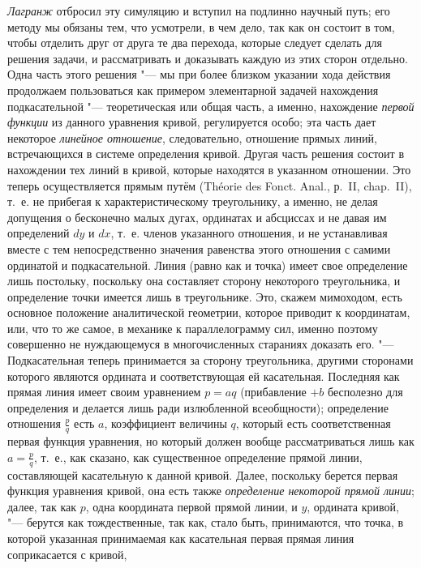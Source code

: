 {\em Лагранж} отбросил эту симуляцию и вступил на
подлинно научный путь; его методу мы обязаны тем, что усмотрели, в чем
дело, так как он состоит в том, чтобы отделить друг от друга те два
перехода, которые следует сделать для решения задачи, и рассматривать и
доказывать каждую из этих сторон отдельно. Одна часть этого решения "--- мы
при более близком указании хода действия продолжаем пользоваться как
примером элементарной задачей нахождения подкасательной "--- теоретическая или
общая часть, а именно, нахождение {\em первой функции}
из данного уравнения кривой, регулируется особо; эта часть дает некоторое
{\em линейное отношение}, следовательно, отношение
прямых линий, встречающихся в системе определения кривой. Другая часть
решения состоит в нахождении тех линий в кривой, которые находятся в
указанном отношении. Это теперь осуществляется прямым путём
(Théorie des Fonct. Anal., р.~II, chap.~II), т.~е. не
прибегая к характеристическому треугольнику, а именно, не делая допущения о
бесконечно малых дугах, ординатах и абсциссах и не давая им определений
$dy$ и $dx$, т.~е. членов
указанного отношения, и не устанавливая вместе с тем непосредственно
значения равенства этого отношения с самими ординатой и подкасательной.
Линия (равно как и точка) имеет свое определение лишь постольку, поскольку
она составляет сторону некоторого треугольника, и определение точки имеется
лишь в треугольнике. Это, скажем мимоходом, есть основное положение
аналитической геометрии, которое приводит к координатам, или, что то же
самое, в механике к параллелограмму сил, именно поэтому совершенно не
нуждающемуся в многочисленных стараниях доказать его. "--- Подкасательная
теперь принимается за сторону треугольника, другими сторонами которого
являются ордината и соответствующая ей касательная. Последняя как прямая
линия имеет своим уравнением $p=aq$ (прибавление
$+b$ бесполезно для определения и делается лишь ради излюбленной
всеобщности); определение отношения $\frac p q$ есть $a$, коэффициент
величины $q$, который есть соответственная первая функция уравнения,
но который должен вообще рассматриваться лишь как $a=\frac p q$,
т.~е., как сказано, как существенное определение прямой линии,
составляющей касательную к данной кривой. Далее, поскольку берется первая
функция уравнения кривой, она есть также
{\em определение некоторой прямой линии}; далее, так
как $p$, одна координата первой прямой линии, и
$y$, ордината кривой, "--- берутся как тождественные,
так как, стало быть, принимаются, что точка, в которой указанная
принимаемая как касательная первая прямая линия соприкасается с кривой,
